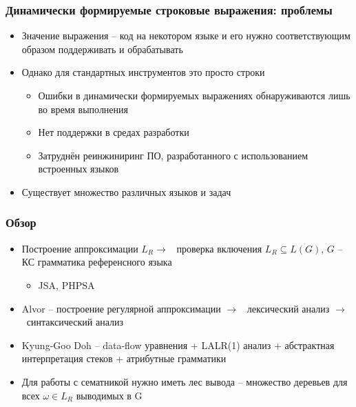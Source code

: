 \documentclass{beamer}
\begin{document}
\begin{frame}
    \transwipe[direction=90]
    \frametitle{Динамически формируемые строковые выражения: проблемы}
    \begin{itemize}
        \item Значение выражения -- код на некотором языке и его нужно соответствующим образом поддерживать и обрабатывать
        \item Однако для стандартных инструментов это просто строки
        \begin{itemize}
            \item Ошибки в динамически формируемых выражениях обнаруживаются лишь во время выполнения
            \item Нет поддержки в средах разработки
            \item Затруднён реинжиниринг ПО, разработанного с использованием встроенных языков                
        \end{itemize}
        \item Существует множество различных языков и задач
    \end{itemize}
\end{frame}

\begin{frame}
    \transwipe[direction=90]
    \frametitle{Обзор}
    \begin{itemize}
        \item Построение аппроксимации $L_R \rightarrow $ \ проверка включения $L_{R} \subseteq L(G)$, $G$ -- КС грамматика референсного языка 
        \begin{itemize}
            \item JSA, PHPSA
        \end{itemize}
        \item Alvor -- построение регулярной аппроксимации  $ \rightarrow $ \ лексический анализ $ \rightarrow $ \ синтаксический анализ
        \item Kyung-Goo Doh -- data-flow уравнения + LALR(1) анализ + абстрактная интерпретация стеков + атрибутные грамматики
        \item Для работы с сематникой нужно иметь лес вывода -- множество деревьев для всех $\omega \in L_R$ выводимых в G
    \end{itemize}
\end{frame}
\end{document}
